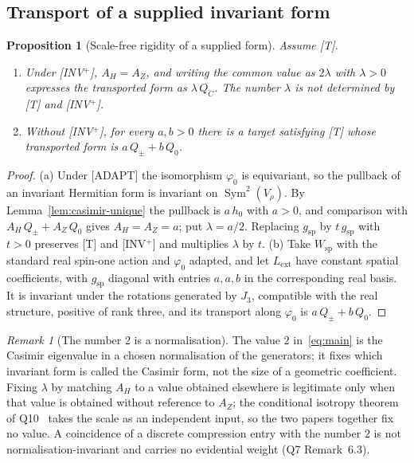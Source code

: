 \documentclass[11pt,a4paper]{article}
\newtheorem{proposition}[theorem]{Proposition}
\theoremstyle{definition}
\theoremstyle{remark}
\newtheorem{remark}[theorem]{Remark}
\DeclareMathOperator{\Sym}{Sym}
\newcommand{\Lext}{L_{\mathrm{ext}}}
\newcommand{\Vr}{V_{\rho}}
\newcommand{\Wsp}{W_{\mathrm{sp}}}
\newcommand{\Az}{A_{Z}}
\newcommand{\AH}{A_{H}}
\begin{document}
    \subsection{Transport of a supplied invariant form}

      \begin{proposition}[Scale-free rigidity of a supplied form]\label{prop:bridge-casimir}
        Assume \textup{[T]}.
        \begin{enumerate}
          \item[(a)] Under \textup{[INV$^+$]}, $\AH = \Az$, and writing the common value as $2\lambda$ with
          $\lambda > 0$ expresses the transported form as $\lambda\,Q_C$.
          The number $\lambda$ is not determined by \textup{[T]} and \textup{[INV$^+$]}.
          \item[(b)] Without \textup{[INV$^+$]}, for every $a, b > 0$ there is a target satisfying \textup{[T]} whose
          transported form is $a\,Q_\pm + b\,Q_0$.
        \end{enumerate}
      \end{proposition}

      \begin{proof}
        (a) Under [ADAPT] the isomorphism $\varphi_0$ is equivariant, so the pullback of an invariant Hermitian form is
        invariant on $\Sym^2(\Vr)$.
        By Lemma~\ref{lem:casimir-unique} the pullback is $a\,h_0$ with $a > 0$, and comparison with
        $\AH\,Q_\pm + \Az\,Q_0$ gives $\AH = \Az = a$; put $\lambda = a/2$.
        Replacing $g_{\mathrm{sp}}$ by $t\,g_{\mathrm{sp}}$ with $t > 0$ preserves [T] and [INV$^+$] and multiplies
        $\lambda$ by $t$.
        (b) Take $\Wsp$ with the standard real spin-one action and $\varphi_0$ adapted, and let $\Lext$ have constant
        spatial coefficients, with $g_{\mathrm{sp}}$ diagonal with entries $a, a, b$ in the corresponding real basis.
        It is invariant under the rotations generated by $J_3$, compatible with the real structure, positive of
        rank three, and its transport along $\varphi_0$ is $a\,Q_\pm + b\,Q_0$.
      \end{proof}

      \begin{remark}[The number 2 is a normalisation]
        The value $2$ in~\eqref{eq:main} is the Casimir eigenvalue in a chosen normalisation of the generators; it
        fixes which invariant form is called the Casimir form, not the size of a geometric coefficient.
        Fixing $\lambda$ by matching $\AH$ to a value obtained elsewhere is legitimate only when that value is obtained
        without reference to $\Az$; the conditional isotropy theorem of Q10~\cite{Beau2026q10} takes the scale as an
        independent input, so the two papers together fix no value.
        A coincidence of a discrete compression entry with the number $2$ is not normalisation-invariant and carries
        no evidential weight (Q7 Remark~6.3).
      \end{remark}
\end{document}
